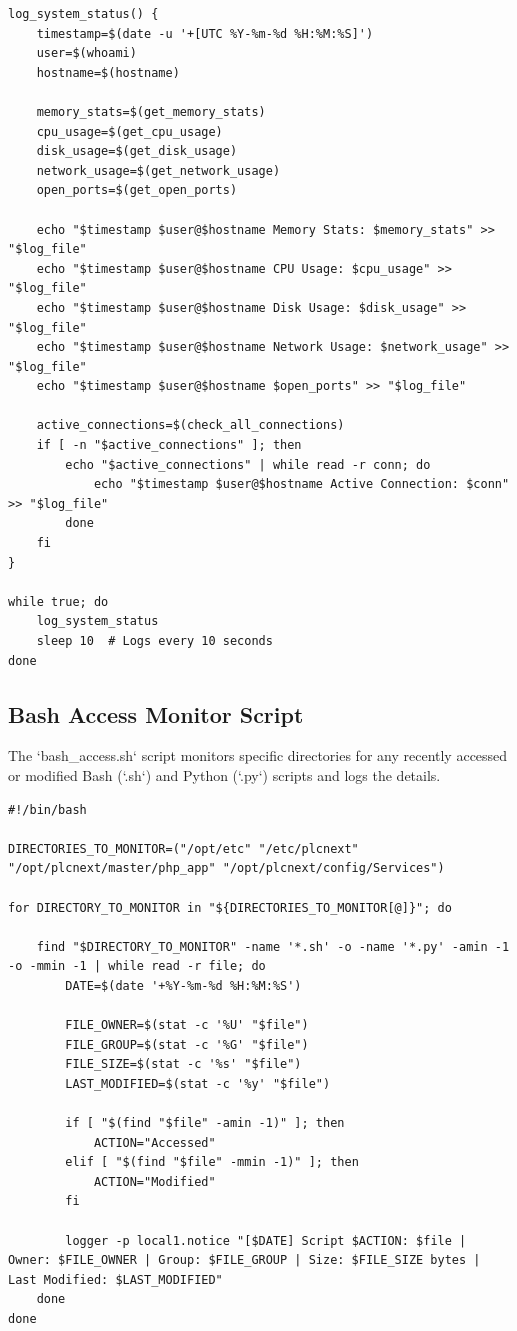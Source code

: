 \documentclass[Master,BMR,english]{twbook}
\begin{document}
\begin{verbatim}
log_system_status() {
    timestamp=$(date -u '+[UTC %Y-%m-%d %H:%M:%S]')
    user=$(whoami)
    hostname=$(hostname)

    memory_stats=$(get_memory_stats)
    cpu_usage=$(get_cpu_usage)
    disk_usage=$(get_disk_usage)
    network_usage=$(get_network_usage)
    open_ports=$(get_open_ports)

    echo "$timestamp $user@$hostname Memory Stats: $memory_stats" >> "$log_file"
    echo "$timestamp $user@$hostname CPU Usage: $cpu_usage" >> "$log_file"
    echo "$timestamp $user@$hostname Disk Usage: $disk_usage" >> "$log_file"
    echo "$timestamp $user@$hostname Network Usage: $network_usage" >> "$log_file"
    echo "$timestamp $user@$hostname $open_ports" >> "$log_file"

    active_connections=$(check_all_connections)
    if [ -n "$active_connections" ]; then
        echo "$active_connections" | while read -r conn; do
            echo "$timestamp $user@$hostname Active Connection: $conn" >> "$log_file"
        done
    fi
}

while true; do
    log_system_status
    sleep 10  # Logs every 10 seconds
done
\end{verbatim}

\subsection{Bash Access Monitor Script}
The `bash\_access.sh` script monitors specific directories for any recently accessed or modified Bash (`.sh`) and Python (`.py`) scripts and logs the details.

\begin{verbatim}
#!/bin/bash

DIRECTORIES_TO_MONITOR=("/opt/etc" "/etc/plcnext" "/opt/plcnext/master/php_app" "/opt/plcnext/config/Services")

for DIRECTORY_TO_MONITOR in "${DIRECTORIES_TO_MONITOR[@]}"; do

    find "$DIRECTORY_TO_MONITOR" -name '*.sh' -o -name '*.py' -amin -1 -o -mmin -1 | while read -r file; do
        DATE=$(date '+%Y-%m-%d %H:%M:%S')
        
        FILE_OWNER=$(stat -c '%U' "$file")
        FILE_GROUP=$(stat -c '%G' "$file")
        FILE_SIZE=$(stat -c '%s' "$file")
        LAST_MODIFIED=$(stat -c '%y' "$file")
        
        if [ "$(find "$file" -amin -1)" ]; then
            ACTION="Accessed"
        elif [ "$(find "$file" -mmin -1)" ]; then
            ACTION="Modified"
        fi
        
        logger -p local1.notice "[$DATE] Script $ACTION: $file | Owner: $FILE_OWNER | Group: $FILE_GROUP | Size: $FILE_SIZE bytes | Last Modified: $LAST_MODIFIED"
    done
done
\end{verbatim}
\end{document}
